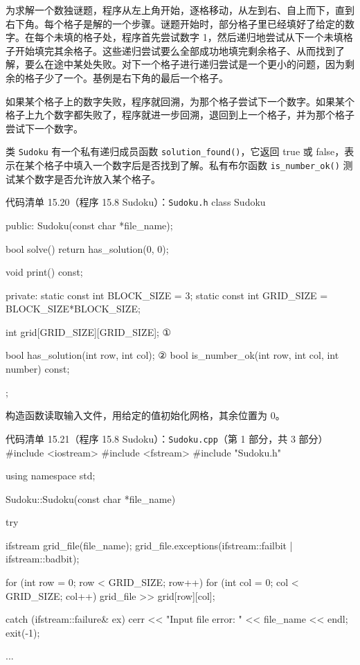 为求解一个数独谜题，程序从左上角开始，逐格移动，从左到右、自上而下，直到右下角。每个格子是解的一个步骤。谜题开始时，部分格子里已经填好了给定的数字。在每个未填的格子处，程序首先尝试数字 1，然后递归地尝试从下一个未填格子开始填完其余格子。这些递归尝试要么全部成功地填完剩余格子、从而找到了解，要么在途中某处失败。对下一个格子进行递归尝试是一个更小的问题，因为剩余的格子少了一个。基例是右下角的最后一个格子。

如果某个格子上的数字失败，程序就回溯，为那个格子尝试下一个数字。如果某个格子上九个数字都失败了，程序就进一步回溯，退回到上一个格子，并为那个格子尝试下一个数字。

类 \texttt{Sudoku} 有一个私有递归成员函数 \texttt{solution\_\allowbreak{}found(\allowbreak{})\allowbreak{}}，它返回 true 或 false，表示在某个格子中填入一个数字后是否找到了解。私有布尔函数 \texttt{is\_\allowbreak{}number\_\allowbreak{}ok(\allowbreak{})\allowbreak{}} 测试某个数字是否允许放入某个格子。

\begin{codeboxt}{代码清单 15.20（程序 15.8 Sudoku）：\texttt{Sudoku.h}}
class Sudoku
{
public:
    Sudoku(const char *file_name);

    bool solve() { return has_solution(0, 0); }

    void print() const;

private:
    static const int BLOCK_SIZE = 3;
    static const int GRID_SIZE  = BLOCK_SIZE*BLOCK_SIZE;

    int grid[GRID_SIZE][GRID_SIZE];                              ①

    bool has_solution(int row, int col);                         ②
    bool is_number_ok(int row, int col, int number) const;
};
\end{codeboxt}
\par
{}\par

构造函数读取输入文件，用给定的值初始化网格，其余位置为 0。

\begin{codeboxt}{代码清单 15.21（程序 15.8 Sudoku）：\texttt{Sudoku.\allowbreak{}cpp}（第 1 部分，共 3 部分）}
#include <iostream>
#include <fstream>
#include "Sudoku.h"

using namespace std;

Sudoku::Sudoku(const char *file_name)
{
    try
    {
        ifstream grid_file(file_name);
        grid_file.exceptions(ifstream::failbit | ifstream::badbit);

        for (int row = 0; row < GRID_SIZE; row++)
        {
            for (int col = 0; col < GRID_SIZE; col++)
            {
                grid_file >> grid[row][col];
            }
        }
    }
    catch (ifstream::failure& ex)
    {
        cerr << "Input file error: " << file_name << endl;
        exit(-1);
    }
}

...
\end{codeboxt}


